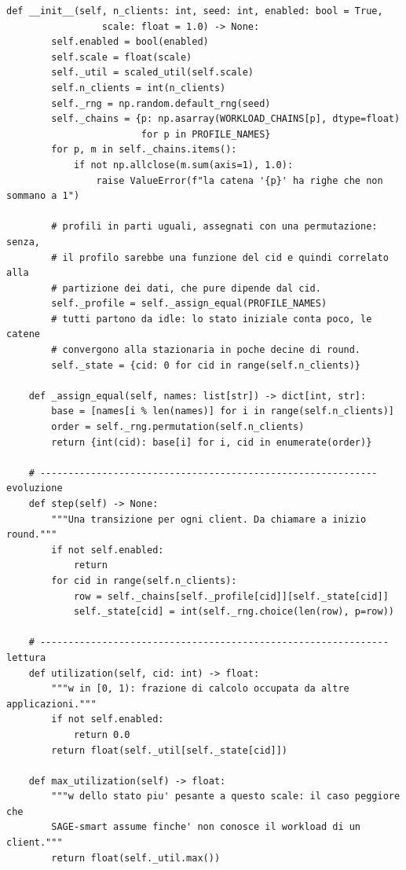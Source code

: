 \documentclass[11pt,a4paper]{article}
\begin{document}
\begin{lstlisting}[style=py,firstnumber=67,caption={\texttt{tesifl/device/workload.py}, lines 67--112}]
    def __init__(self, n_clients: int, seed: int, enabled: bool = True,
                 scale: float = 1.0) -> None:
        self.enabled = bool(enabled)
        self.scale = float(scale)
        self._util = scaled_util(self.scale)
        self.n_clients = int(n_clients)
        self._rng = np.random.default_rng(seed)
        self._chains = {p: np.asarray(WORKLOAD_CHAINS[p], dtype=float)
                        for p in PROFILE_NAMES}
        for p, m in self._chains.items():
            if not np.allclose(m.sum(axis=1), 1.0):
                raise ValueError(f"la catena '{p}' ha righe che non sommano a 1")

        # profili in parti uguali, assegnati con una permutazione: senza,
        # il profilo sarebbe una funzione del cid e quindi correlato alla
        # partizione dei dati, che pure dipende dal cid.
        self._profile = self._assign_equal(PROFILE_NAMES)
        # tutti partono da idle: lo stato iniziale conta poco, le catene
        # convergono alla stazionaria in poche decine di round.
        self._state = {cid: 0 for cid in range(self.n_clients)}

    def _assign_equal(self, names: list[str]) -> dict[int, str]:
        base = [names[i % len(names)] for i in range(self.n_clients)]
        order = self._rng.permutation(self.n_clients)
        return {int(cid): base[i] for i, cid in enumerate(order)}

    # ------------------------------------------------------------ evoluzione
    def step(self) -> None:
        """Una transizione per ogni client. Da chiamare a inizio round."""
        if not self.enabled:
            return
        for cid in range(self.n_clients):
            row = self._chains[self._profile[cid]][self._state[cid]]
            self._state[cid] = int(self._rng.choice(len(row), p=row))

    # -------------------------------------------------------------- lettura
    def utilization(self, cid: int) -> float:
        """w in [0, 1): frazione di calcolo occupata da altre applicazioni."""
        if not self.enabled:
            return 0.0
        return float(self._util[self._state[cid]])

    def max_utilization(self) -> float:
        """w dello stato piu' pesante a questo scale: il caso peggiore che
        SAGE-smart assume finche' non conosce il workload di un client."""
        return float(self._util.max())
\end{lstlisting}
\end{document}

